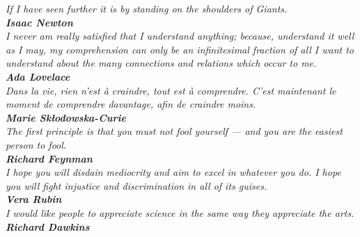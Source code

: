 \cleardoublepage\thispagestyle{empty}
\vspace{10cm}\hspace{5cm}
\parbox{12cm}{\sffamily\itshape\Large
	If I have seen further it is by standing on the shoulders of Giants.\\[10pt]
	\textup{\textbf{Isaac Newton}}\\[35pt]
	I never am really satisfied that I understand anything; because, understand it well as I may, my comprehension can only be an infinitesimal fraction of all I want to understand about the many connections and relations which occur to me.\\[10pt]
	\textup{\textbf{Ada Lovelace}}\\[35pt]
	Dans la vie, rien n'est à craindre, tout est à comprendre. C'est maintenant le moment de comprendre davantage, afin de craindre moins.\\[10pt]
	\textup{\textbf{Marie Skłodowska-Curie}}\\[35pt]
	The first principle is that you must not fool yourself --- and you are the easiest person to fool.\\[10pt]
	\textup{\textbf{Richard Feynman}}\\[35pt]
	I hope you will disdain mediocrity and aim to excel in whatever you do. I hope you will fight injustice and discrimination in all of its guises.\\[10pt]
	\textup{\textbf{Vera Rubin}}\\[35pt]
	I would like people to appreciate science in the same way they appreciate the arts.\\[10pt]
	\textup{\textbf{Richard Dawkins}}}
